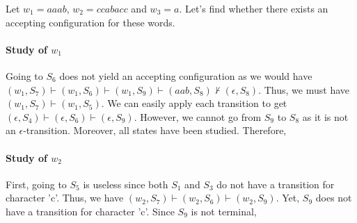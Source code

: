 \documentclass[a4paper,11pt,titlepage]{article}
\begin{document}
Let $w_1=aaab$, $w_2=ccabacc$ and $w_3=a$. Let's find whether there exists an accepting configuration for these words.

\paragraph*{Study of $w_1$} Going to $S_6$ does not yield an accepting configuration as we would have $(w_1,S_7)\vdash(w_1, S_6)\vdash(w_1,S_9)\vdash(aab,S_8)\nvdash(\epsilon,S_8)$. Thus, we must have $(w_1,S_7)\vdash(w_1,S_5)$. We can easily apply each transition to get $(\epsilon,S_4)\vdash(\epsilon,S_6)\vdash(\epsilon,S_9)$. However, we cannot go from $S_9$ to $S_8$ as it is not an $\epsilon$-transition. Moreover, all states have been studied. Therefore, 

\paragraph*{Study of $w_2$} First, going to $S_5$ is useless since both $S_1$ and $S_3$ do not have a transition for character 'c'. Thus, we have $(w_2,S_7)\vdash(w_2,S_6)\vdash(w_2,S_9)$. Yet, $S_9$ does not have a transition for character 'c'. Since $S_9$ is not terminal, 
\end{document}
